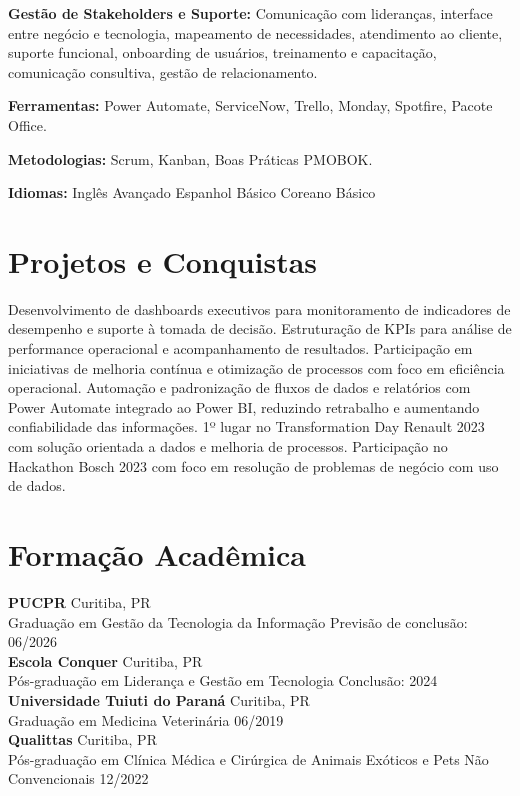 \documentclass[11pt,a4paper]{article}
\begin{document}
\textbf{Gestão de Stakeholders e Suporte:} Comunicação com lideranças, interface entre negócio e tecnologia, mapeamento de necessidades, atendimento ao cliente, suporte funcional, onboarding de usuários, treinamento e capacitação, comunicação consultiva, gestão de relacionamento.

\textbf{Ferramentas:} Power Automate, ServiceNow, Trello, Monday, Spotfire, Pacote Office.

\textbf{Metodologias:} Scrum, Kanban, Boas Práticas PMOBOK.

\textbf{Idiomas:} Inglês Avançado \enspace\textbullet\enspace Espanhol Básico \enspace\textbullet\enspace Coreano Básico

\section{Projetos e Conquistas}

Desenvolvimento de dashboards executivos para monitoramento de indicadores de desempenho e suporte à tomada de decisão. Estruturação de KPIs para análise de performance operacional e acompanhamento de resultados. Participação em iniciativas de melhoria contínua e otimização de processos com foco em eficiência operacional. Automação e padronização de fluxos de dados e relatórios com Power Automate integrado ao Power BI, reduzindo retrabalho e aumentando confiabilidade das informações. 1º lugar no Transformation Day Renault 2023 com solução orientada a dados e melhoria de processos. Participação no Hackathon Bosch 2023 com foco em resolução de problemas de negócio com uso de dados.

\section{Formação Acadêmica}

\textbf{PUCPR} \hfill Curitiba, PR\\
Graduação em Gestão da Tecnologia da Informação \hfill Previsão de conclusão: 06/2026\\[6pt]

\textbf{Escola Conquer} \hfill Curitiba, PR\\
Pós-graduação em Liderança e Gestão em Tecnologia \hfill Conclusão: 2024\\[6pt]

\textbf{Universidade Tuiuti do Paraná} \hfill Curitiba, PR\\
Graduação em Medicina Veterinária \hfill 06/2019\\[6pt]

\textbf{Qualittas} \hfill Curitiba, PR\\
Pós-graduação em Clínica Médica e Cirúrgica de Animais Exóticos e Pets Não Convencionais \hfill 12/2022
\end{document}

